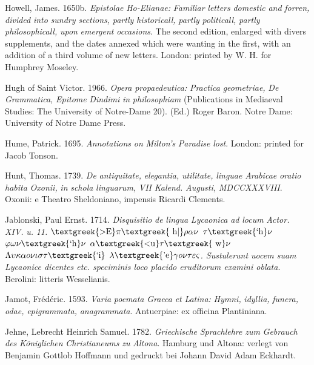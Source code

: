 Howell, James. 1650b. \textit{Epistolae} \textit{Ho-Elianae:} \textit{Familiar} \textit{letters} \textit{domestic} \textit{and} \textit{forren,} \textit{divided} \textit{into} \textit{sundry} \textit{sections,} \textit{partly} \textit{historicall,} \textit{partly} \textit{politicall,} \textit{partly} \textit{philosophicall,} \textit{upon} \textit{emergent} \textit{occasions}. The second edition, enlarged with divers supplements, and the dates annexed which were wanting in the first, with an addition of a third volume of new letters. London: printed by W. H. for Humphrey Moseley.

Hugh of Saint Victor. 1966. \textit{Opera} \textit{propaedeutica:} \textit{Practica} \textit{geometriae,} \textit{De} \textit{Grammatica,} \textit{Epitome} \textit{Dindimi} \textit{in} \textit{philosophiam} (Publications in Mediaeval Studies: The University of Notre-Dame 20). (Ed.) Roger Baron. Notre Dame: University of Notre Dame Press.

Hume, Patrick. 1695. \textit{Annotations} \textit{on} \textit{Milton’s} \textit{Paradise} \textit{lost}. London: printed for Jacob Tonson.

Hunt, Thomas. 1739. \textit{De} \textit{antiquitate,} \textit{elegantia,} \textit{utilitate,} \textit{linguae} \textit{Arabicae} \textit{oratio} \textit{habita} \textit{Oxonii,} \textit{in} \textit{schola} \textit{linguarum,} \textit{VII} \textit{Kalend.} \textit{Augusti,} \textit{MDCCXXXVIII}. Oxonii: e Theatro Sheldoniano, impensis Ricardi Clements.

Jablonski, Paul Ernst. 1714. \textit{Disquisitio} \textit{de} \textit{lingua} \textit{Lycaonica} \textit{ad} \textit{locum} \textit{Actor.} \textit{XIV.} \textit{u.} \textit{11.} \textit{$\text{\textgreek{>E}}\pi \text{\textgreek{~h|}}\rho \alpha \nu $ $\tau \text{\textgreek{`h}}\nu $ $\varphi \omega \nu \text{\textgreek{`h}}\nu $ $\alpha \text{\textgreek{<u}}\tau \text{\textgreek{~w}}\nu $ $\Lambda \upsilon \kappa \alpha o\nu \iota \sigma \tau \text{\textgreek{`i}}$ $\lambda \text{\textgreek{'e}}\gamma o\nu \tau \varepsilon \varsigma $. Sustulerunt uocem suam Lycaonice dicentes etc. speciminis loco placido eruditorum examini oblata}. Berolini: litteris Wesselianis.

Jamot, Frédéric. 1593. \textit{Varia} \textit{poemata} \textit{Graeca} \textit{et} \textit{Latina:} \textit{Hymni,} \textit{idyllia,} \textit{funera,} \textit{odae,} \textit{epigrammata,} \textit{anagrammata}. Antuerpiae: ex officina Plantiniana.

Jehne, Lebrecht Heinrich Samuel. 1782. \textit{Griechische} \textit{Sprachlehre} \textit{zum} \textit{Gebrauch} \textit{des} \textit{Königlichen} \textit{Christianeums} \textit{zu} \textit{Altona}. Hamburg und Altona: verlegt von Benjamin Gottlob Hoffmann und gedruckt bei Johann David Adam Eckhardt.

